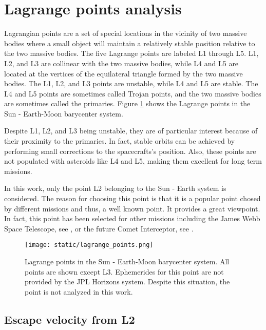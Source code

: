 \section{Lagrange points analysis}
\label{sec:lagrange-points-analysis}

Lagrangian points are a set of special locations in the vicinity of two massive
bodies where a small object will maintain a relatively stable position relative
to the two massive bodies. The five Lagrange points are labeled L1 through L5.
L1, L2, and L3 are collinear with the two massive bodies, while L4 and L5 are
located at the vertices of the equilateral triangle formed by the two massive
bodies. The L1, L2, and L3 points are unstable, while L4 and L5 are stable. The
L4 and L5 points are sometimes called Trojan points, and the two massive bodies
are sometimes called the primaries. Figure \ref{fig:lagrange_points} shows the
Lagrange points in the Sun - Earth-Moon barycenter system.

Despite L1, L2, and L3 being unstable, they are of particular interest because
of their proximity to the primaries. In fact, stable orbits can be achieved
by performing small corrections to the spacecrafts's position. Also, these
points are not populated with asteroids like L4 and L5, making them excellent
for long term missions.

In this work, only the point L2 belonging to the Sun - Earth system is
considered. The reason for choosing this point is that it is a popular point
chosed by different missions and thus, a well known point. It provides a great
viewpoint. In fact, this point has been selected for other missions including
the James Webb Space Telescope, see \cite{gardner2006}, or the future Comet
Interceptor, see \cite{jones2019}.

\begin{figure}[H]
  \centering
  \texttt{[image: static/lagrange\_points.png]}
  \caption[Lagrange points in the Sun - Earth system.]{Lagrange points in the
    Sun - Earth-Moon barycenter system. All points are shown except L3. Ephemerides for this
    point are not provided by the JPL Horizons system. Despite this
    situation, the point is not analyzed in this work.}
  \label{fig:lagrange_points}
\end{figure}

\subsection{Escape velocity from L2}

